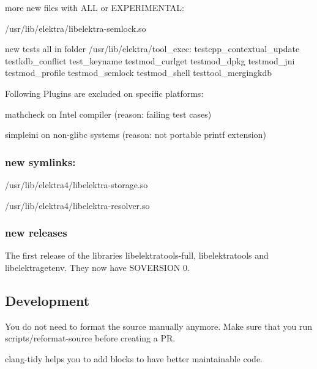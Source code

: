 more new files with A\+L\+L or E\+X\+P\+E\+R\+I\+M\+E\+N\+T\+A\+L\+:


\begin{DoxyItemize}
\item /usr/lib/elektra/libelektra-\/semlock.so
\end{DoxyItemize}

new tests all in folder /usr/lib/elektra/tool\+\_\+exec\+: testcpp\+\_\+contextual\+\_\+update testkdb\+\_\+conflict test\+\_\+keyname testmod\+\_\+curlget testmod\+\_\+dpkg testmod\+\_\+jni testmod\+\_\+profile testmod\+\_\+semlock testmod\+\_\+shell testtool\+\_\+mergingkdb

Following Plugins are excluded on specific platforms\+:


\begin{DoxyItemize}
\item mathcheck on Intel compiler (reason\+: failing test cases)
\item simpleini on non-\/glibc systems (reason\+: not portable printf extension)
\end{DoxyItemize}

\subsubsection*{new symlinks\+:}


\begin{DoxyItemize}
\item /usr/lib/elektra4/libelektra-\/storage.so
\item /usr/lib/elektra4/libelektra-\/resolver.so
\end{DoxyItemize}

\subsubsection*{new releases}

The first release of the libraries libelektratools-\/full, libelektratools and libelektragetenv. They now have S\+O\+V\+E\+R\+S\+I\+O\+N 0.

\subsection*{Development}

You do not need to format the source manually anymore. Make sure that you run scripts/reformat-\/source before creating a P\+R.

{\ttfamily clang-\/tidy} helps you to add blocks to have better maintainable code.

